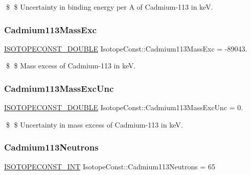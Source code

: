 \$ \$ Uncertainty in binding energy per A of Cadmium-\/113 in keV. \mbox{\label{group___isotope_const-_cadmium-_cd113_ga12c6818358fb10cccaa1549f4bd63967}} 
\subsubsection{\texorpdfstring{Cadmium113\+Mass\+Exc}{Cadmium113MassExc}}
{\footnotesize\ttfamily \mbox{\hyperlink{group___isotope_const-_macros_ga8f45a7272ce02c0b4c65c44636ed719a}{I\+S\+O\+T\+O\+P\+E\+C\+O\+N\+S\+T\+\_\+\+D\+O\+U\+B\+LE}} Isotope\+Const\+::\+Cadmium113\+Mass\+Exc = -\/89043.}

\$ \$ Mass excess of Cadmium-\/113 in keV. \mbox{\label{group___isotope_const-_cadmium-_cd113_gaf8c15605434aad5c530f083f451b42e7}} 
\subsubsection{\texorpdfstring{Cadmium113\+Mass\+Exc\+Unc}{Cadmium113MassExcUnc}}
{\footnotesize\ttfamily \mbox{\hyperlink{group___isotope_const-_macros_ga8f45a7272ce02c0b4c65c44636ed719a}{I\+S\+O\+T\+O\+P\+E\+C\+O\+N\+S\+T\+\_\+\+D\+O\+U\+B\+LE}} Isotope\+Const\+::\+Cadmium113\+Mass\+Exc\+Unc = 0.}

\$ \$ Uncertainty in mass excess of Cadmium-\/113 in keV. \mbox{\label{group___isotope_const-_cadmium-_cd113_gab965a31598178d6036178b90a4ccba12}} 
\subsubsection{\texorpdfstring{Cadmium113\+Neutrons}{Cadmium113Neutrons}}
{\footnotesize\ttfamily \mbox{\hyperlink{group___isotope_const-_macros_ga5f18360b3e99483a35c32d789e62621c}{I\+S\+O\+T\+O\+P\+E\+C\+O\+N\+S\+T\+\_\+\+I\+NT}} Isotope\+Const\+::\+Cadmium113\+Neutrons = 65}


